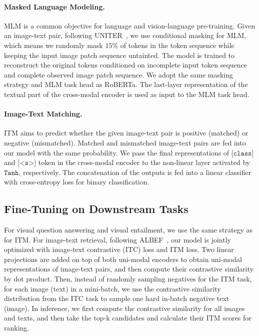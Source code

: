 \documentclass[letterpaper]{article} %
\begin{document}
\paragraph{Masked Language Modeling.} 
MLM is a common objective for language and vision-language pre-training. Given an image-text pair, following UNITER~\citep{chen2020uniter}, we use conditional masking for MLM, which means we randomly mask $15\%$ of tokens in the token sequence while keeping the input image patch sequence untainted. The model is trained to reconstruct the original tokens conditioned on incomplete input token sequence and complete observed image patch sequence. We adopt the same masking strategy and MLM task head as RoBERTa. The last-layer representation of the textual part of the cross-modal encoder is used as input to the MLM task head.

\paragraph{Image-Text Matching.}
ITM aims to predict whether the given image-text pair is positive (matched) or negative (mismatched). Matched and mismatched image-text pairs are fed into our model with the same probability. We pass the final representations of $\texttt{[class]}$ and $\texttt{[<s>]}$ token in the cross-modal encoder to the non-linear layer activated by $\texttt{Tanh}$, respectively. The concatenation of the outputs is fed into a linear classifier with cross-entropy loss for binary classification. 

\subsection{Fine-Tuning on Downstream Tasks}
For visual question answering and visual entailment, we use the same strategy as for ITM.
For image-text retrieval, following ALBEF~\citep{li2021align}, our model is jointly optimized with image-text contrastive (ITC) loss and ITM loss.
Two linear projections are added on top of both uni-modal encoders to obtain uni-modal representations of image-text pairs, and then compute their contrastive similarity by dot product. 
Then, instead of randomly sampling negatives for the ITM task, for each image (text) in a mini-batch, we use the contrastive similarity distribution from the ITC task to sample one hard in-batch negative text (image).
In inference, we first compute the contrastive similarity for all images and texts, and then take the top-k candidates and calculate their ITM scores for ranking.
\end{document}
